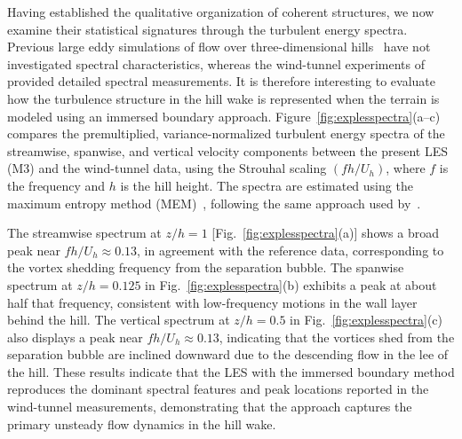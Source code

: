 \documentclass[%
superscriptaddress,
 amsmath,amssymb,
pra,
showkeys,
]{revtex4-2}
\begin{document}
Having established the qualitative organization of coherent structures, we now examine their statistical signatures through the turbulent energy spectra. Previous large eddy simulations of flow over three-dimensional hills~\cite{diebold2013flow,fang2016intercomparison,liu2020wall} have not investigated spectral characteristics, whereas the wind-tunnel experiments of~\citet{ishihara1999wind} provided detailed spectral measurements. It is therefore interesting to evaluate how the turbulence structure in the hill wake is represented when the terrain is modeled using an immersed boundary approach.  Figure~\ref{fig:explesspectra}(a--c) compares the premultiplied, variance-normalized turbulent energy spectra of the streamwise, spanwise, and vertical velocity components between the present LES (M3) and the wind-tunnel data, using the Strouhal scaling $(f h / U_h)$, where $f$ is the frequency and $h$ is the hill height. The spectra are estimated using the maximum entropy method (MEM)~\cite{burg1975maximum}, following the same approach used by~\citet{ishihara1999wind}.  

The streamwise spectrum at $z/h = 1$ [Fig.~\ref{fig:explesspectra}(a)] shows a broad peak near $f h / U_h \approx 0.13$, in agreement with the reference data, corresponding to the vortex shedding frequency from the separation bubble. The spanwise spectrum at $z/h = 0.125$ in Fig.~\ref{fig:explesspectra}(b) exhibits a peak at about half that frequency, consistent with low-frequency motions in the wall layer behind the hill. The vertical spectrum at $z/h = 0.5$ in Fig.~\ref{fig:explesspectra}(c) also displays a peak near $f h / U_h \approx 0.13$, indicating that the vortices shed from the separation bubble are inclined downward due to the descending flow in the lee of the hill. These results indicate that the LES with the immersed boundary method reproduces the dominant spectral features and peak locations reported in the wind-tunnel measurements, demonstrating that the approach captures the primary unsteady flow dynamics in the hill wake.
\end{document}
